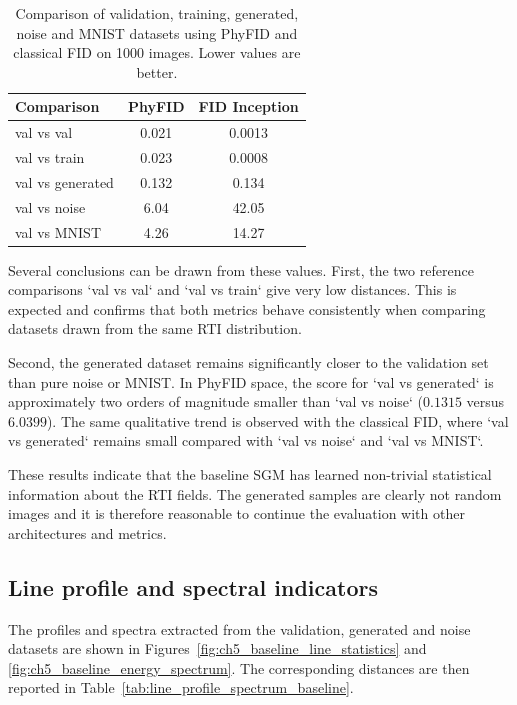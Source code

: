 \begin{table}[H]
    \centering
    \begin{tabular}{lcc}
        \hline
        Comparison & PhyFID & FID Inception \\
        \hline
        val vs val & 0.021 & 0.0013 \\
        val vs train & 0.023 & 0.0008 \\
        val vs generated & 0.132 & 0.134 \\
        val vs noise & 6.04 & 42.05 \\
        val vs MNIST & 4.26 & 14.27 \\
        \hline
    \end{tabular}
    \caption{Comparison of validation, training, generated, noise and MNIST
    datasets using PhyFID and classical FID on 1000 images. Lower values are
    better.}
    \label{tab:fid_phyfid_baseline}
\end{table}

Several conclusions can be drawn from these values. First, the two reference
comparisons `val vs val` and `val vs train` give very low distances. This is
expected and confirms that both metrics behave consistently when comparing
datasets drawn from the same RTI distribution.

Second, the generated dataset remains significantly closer to the validation
set than pure noise or MNIST. In PhyFID space, the score for `val vs generated`
is approximately two orders of magnitude smaller than `val vs noise`
($0.1315$ versus $6.0399$). The same qualitative trend is observed with the
classical FID, where `val vs generated` remains small compared with
`val vs noise` and `val vs MNIST`.

These results indicate that the baseline SGM has learned non-trivial
statistical information about the RTI fields. The generated samples are clearly
not random images and it is therefore reasonable to continue the evaluation with 
other architectures and metrics.

\subsection{Line profile and spectral indicators}

The profiles and spectra extracted from the validation, generated and noise datasets are shown in Figures~\ref{fig:ch5_baseline_line_statistics} and
\ref{fig:ch5_baseline_energy_spectrum}. The corresponding distances are then reported in Table~\ref{tab:line_profile_spectrum_baseline}.

